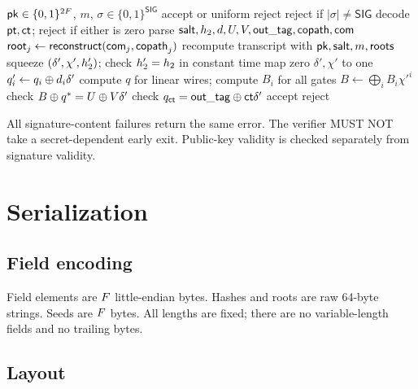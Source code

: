 \documentclass[11pt,a4paper]{article}
\begin{document}
\begin{algorithm}[ht]
\caption{$\Verify(\pk,m,\sigma)$}
\label{alg:verify}
\begin{algorithmic}[1]
\REQUIRE $\mathsf{pk}\in\{0,1\}^{2F}$, $m$, $\sigma\in\{0,1\}^{\mathsf{SIG}}$
\ENSURE accept or uniform reject
\STATE reject if $|\sigma|\ne\mathsf{SIG}$
\STATE decode $\mathsf{pt},\mathsf{ct}$; reject if either is zero
\STATE parse $\mathsf{salt},h_2,d,U,V,\mathsf{out\_tag},\mathsf{copath},\mathsf{com}$
  \STATE $\mathsf{root}_j\gets\mathsf{reconstruct}(\mathsf{com}_j,\mathsf{copath}_j)$
\ENDFOR
\STATE recompute transcript with $\mathsf{pk},\mathsf{salt},m,\mathsf{roots}$
\STATE squeeze $(\delta',\chi',h_2')$; check $h_2'=h_2$ in constant time
\STATE map zero $\delta',\chi'$ to one
  \STATE $q_i'\gets q_i\oplus d_i\delta'$
\ENDFOR
\STATE compute $q$ for linear wires; compute $B_i$ for all gates
\STATE $B\gets\bigoplus_i B_i\chi'^i$
\STATE check $B\oplus q^\ast=U\oplus V\delta'$
\STATE check $q_{\mathsf{ct}}=\mathsf{out\_tag}\oplus\mathsf{ct}\delta'$
  \RETURN accept
\ELSE
  \RETURN reject
\ENDIF
\end{algorithmic}
\end{algorithm}

All signature-content failures return the same error. The verifier MUST NOT
take a secret-dependent early exit. Public-key validity is checked separately
from signature validity.

\section{Serialization}
\label{sec:serialization}

\subsection{Field encoding}

Field elements are $F$ little-endian bytes. Hashes and roots are raw
64-byte strings. Seeds are $F$ bytes. All lengths are fixed; there are
no variable-length fields and no trailing bytes.

\subsection{Layout}
\end{document}
